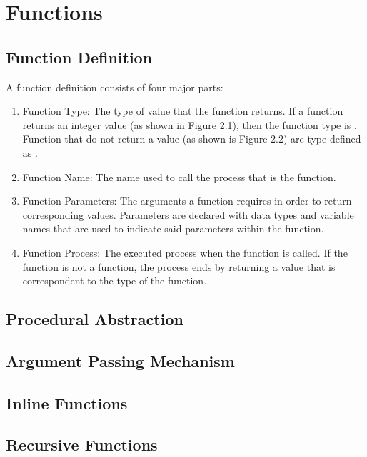 \chapter{Functions}

\section{Function Definition}
A function definition consists of four major parts:
\begin{enumerate}
\item Function Type: The type of value that the function returns. If a function
    returns an integer value (as shown in Figure 2.1), then the function type is
    . Function that do not return a value (as shown is Figure 2.2) are
    type-defined as .
\item Function Name: The name used to call the process that is the function.
\item Function Parameters: The arguments a function requires in order to return
    corresponding values. Parameters are declared with data types and variable
    names that are used to indicate said parameters within the function.
\item Function Process: The executed process when the function is called. If the
    function is not a  function, the process ends by returning a value
    that is correspondent to the type of the function.
\end{enumerate}


\section{Procedural Abstraction}

\section{Argument Passing Mechanism}

\section{Inline Functions}

\section{Recursive Functions}
